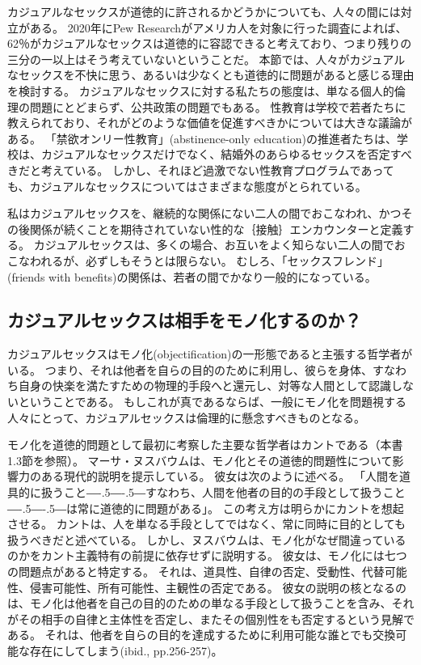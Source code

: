 \documentclass[paper=a4,book,openany]{jlreq}
\def\DDASH{―\kern-.5\zw―\kern-.5\zw―} %
\begin{document}
カジュアルなセックスが道徳的に許されるかどうかについても、人々の間には対立がある。
2020年にPew Researchがアメリカ人を対象に行った調査によれば、62％がカジュアルなセックスは道徳的に容認できると考えており、つまり残りの三分の一以上はそう考えていないということだ\citep{brow20:_near_half_u}。
本節では、人々がカジュアルなセックスを不快に思う、あるいは少なくとも道徳的に問題があると感じる理由を検討する。
カジュアルなセックスに対する私たちの態度は、単なる個人的倫理の問題にとどまらず、公共政策の問題でもある。
性教育は学校で若者たちに教えられており、それがどのような価値を促進すべきかについては大きな議論がある。
「禁欲オンリー性教育」(abstinence-only education)の推進者たちは、学校は、カジュアルなセックスだけでなく、結婚外のあらゆるセックスを否定すべきだと考えている。
しかし、それほど過激でない性教育プログラムであっても、カジュアルなセックスについてはさまざまな態度がとられている。

私はカジュアルセックスを、継続的な関係にない二人の間でおこなわれ、かつその後関係が続くことを期待されていない性的な｛接触｝{エンカウンター}と定義する。
カジュアルセックスは、多くの場合、お互いをよく知らない二人の間でおこなわれるが、必ずしもそうとは限らない。
むしろ、「セックスフレンド」(friends with benefits)の関係は、若者の間でかなり一般的になっている\citep{dube17:_why_frien_benef}。

\subsection{カジュアルセックスは相手をモノ化するのか？}

カジュアルセックスはモノ化(objectification)の一形態であると主張する哲学者がいる。
つまり、それは他者を自らの目的のために利用し、彼らを身体、すなわち自身の快楽を満たすための物理的手段へと還元し、対等な人間として認識しないということである。
もしこれが真であるならば、一般にモノ化を問題視する人々にとって、カジュアルセックスは倫理的に懸念すべきものとなる。

モノ化を道徳的問題として最初に考察した主要な哲学者はカントである（本書1.3節を参照）。
マーサ・ヌスバウムは、モノ化とその道徳的問題性について影響力のある現代的説明を提示している。
彼女は次のように述べる。
「人間を道具的に扱うこと{\DDASH}すなわち、人間を他者の目的の手段として扱うこと{\DDASH}は常に道徳的に問題がある」\citep[p.289]{nussbaum95:_objec}。
この考え方は明らかにカントを想起させる。
カントは、人を単なる手段としてではなく、常に同時に目的としても扱うべきだと述べている。
しかし、ヌスバウムは、モノ化がなぜ間違っているのかをカント主義特有の前提に依存せずに説明する。
彼女は、モノ化には七つの問題点があると特定する。
それは、道具性、自律の否定、受動性、代替可能性、侵害可能性、所有可能性、主観性の否定である。
彼女の説明の核となるのは、モノ化は他者を自己の目的のための単なる手段として扱うことを含み、それがその相手の自律と主体性を否定し、またその個別性をも否定するという見解である。
それは、他者を自らの目的を達成するために利用可能な誰とでも交換可能な存在にしてしまう(ibid., pp.256-257)。
\end{document}
